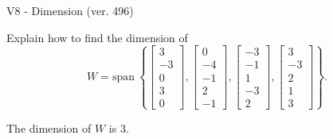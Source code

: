 \begin{exercise}
  \begin{exerciseTitle}V8 - Dimension (ver. 496)\end{exerciseTitle}
  \begin{exerciseStatement}
    Explain how to find the dimension of 
\[W=\mathrm{span}\ \left\{\left[\begin{array}{r}
3 \\
-3 \\
0 \\
3 \\
0
\end{array}\right] , \left[\begin{array}{r}
0 \\
-4 \\
-1 \\
2 \\
-1
\end{array}\right] , \left[\begin{array}{r}
-3 \\
-1 \\
1 \\
-3 \\
2
\end{array}\right] , \left[\begin{array}{r}
3 \\
-3 \\
2 \\
1 \\
3
\end{array}\right]\right\}.\]



  \end{exerciseStatement}
  \begin{exerciseAnswer}
   The dimension of \(W\) is  \(3\).
  


  \end{exerciseAnswer}
\end{exercise}